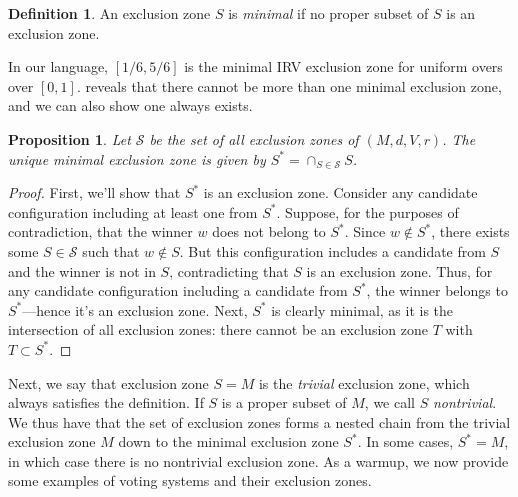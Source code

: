 \documentclass{article}
\theoremstyle{theorem}
\newtheorem{proposition}{Proposition}
\theoremstyle{definition}
\newtheorem{definition}{Definition}
\begin{document}
\begin{definition}
  An exclusion zone $S$ is \emph{minimal} if no proper subset of $S$ is an exclusion zone.
\end{definition}

In our language, $[1/6, 5/6]$ is the minimal IRV exclusion zone for uniform overs over $[0, 1]$.  reveals that there cannot be more than one minimal exclusion zone, and we can also show one always exists. 

\begin{proposition}
Let $\mathcal S$ be the set of all exclusion zones of $(M, d, V, r)$. The unique minimal exclusion zone is given by $S^* = \cap_{S \in \mathcal S} S$.
\end{proposition}
\begin{proof}
First, we'll show that $S^*$ is an exclusion zone. Consider any candidate configuration including at least one from $S^*$. Suppose, for the purposes of contradiction, that the winner $w$ does not belong to $S^*$. Since $w \notin S^*$, there exists some $S \in \mathcal S$ such that $w\notin S$. But this configuration includes a candidate from $S$ and the winner is not in $S$, contradicting that $S$ is an exclusion zone. Thus, for any candidate configuration including a candidate from $S^*$, the winner belongs to $S^*$---hence it's an exclusion zone. Next, $S^*$ is clearly minimal, as it is the intersection of all exclusion zones: there cannot be an exclusion zone $T$ with $T \subset S^*$.
\end{proof}

Next, we say that exclusion zone $S = M$ is the \emph{trivial} exclusion zone, which always satisfies the definition. If $S$ is a proper subset of $M$, we call $S$ \emph{nontrivial}. We thus have that the set of exclusion zones forms a nested chain from the trivial exclusion zone $M$ down to the minimal exclusion zone $S^*$. In some cases, $S^* = M$, in which case there is no nontrivial exclusion zone. As a warmup, we now provide some examples of voting systems and their exclusion zones.
\end{document}
